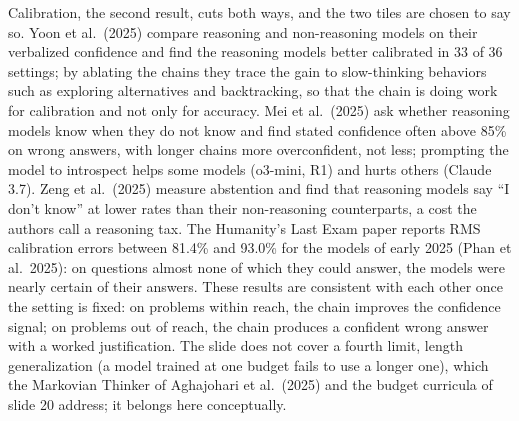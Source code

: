 \documentclass[11pt,letterpaper]{article}
\begin{document}
Calibration, the second result, cuts both ways, and the two tiles are chosen to say so. Yoon et al.\ (2025) compare reasoning and non-reasoning models on their verbalized confidence and find the reasoning models better calibrated in 33 of 36 settings; by ablating the chains they trace the gain to slow-thinking behaviors such as exploring alternatives and backtracking, so that the chain is doing work for calibration and not only for accuracy. Mei et al.\ (2025) ask whether reasoning models know when they do not know and find stated confidence often above 85\% on wrong answers, with longer chains more overconfident, not less; prompting the model to introspect helps some models (o3-mini, R1) and hurts others (Claude 3.7). Zeng et al.\ (2025) measure abstention and find that reasoning models say ``I don't know'' at lower rates than their non-reasoning counterparts, a cost the authors call a reasoning tax. The Humanity's Last Exam paper reports RMS calibration errors between 81.4\% and 93.0\% for the models of early 2025 (Phan et al.\ 2025): on questions almost none of which they could answer, the models were nearly certain of their answers. These results are consistent with each other once the setting is fixed: on problems within reach, the chain improves the confidence signal; on problems out of reach, the chain produces a confident wrong answer with a worked justification. The slide does not cover a fourth limit, length generalization (a model trained at one budget fails to use a longer one), which the Markovian Thinker of Aghajohari et al.\ (2025) and the budget curricula of slide 20 address; it belongs here conceptually.
\end{document}
